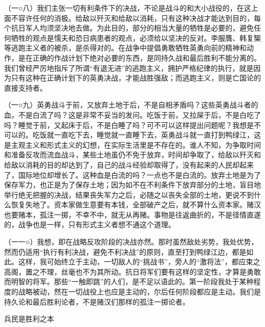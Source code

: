 \documentclass[UTF8, 12pt, a4paper]{ctexrep}
\begin{document}
（一○八）我们主张一切有利条件下的决战，不论是战斗的和大小战役的，在这上面不容许任何的消极。给敌以歼灭和给敌以消耗，只有这种决战才能达到目的，每个抗日军人均须坚决地去做。为此目的，部分的相当大量的牺牲是必要的，避免任何牺牲的观点是懦夫和恐日病患者的观点，必须给以坚决的反对。李服膺、韩复榘等逃跑主义者的被杀，是杀得对的。在战争中提倡勇敢牺牲英勇向前的精神和动作，是在正确的作战计划下绝对必要的东西，是同持久战和最后胜利不能分离的。我们曾经严厉地指斥了所谓“有退无进”的逃跑主义，拥护严格纪律的执行，就是因为只有这种在正确计划下的英勇决战，才能战胜强敌；而逃跑主义，则是亡国论的直接支持者。

（一○九）英勇战斗于前，又放弃土地于后，不是自相矛盾吗？这些英勇战斗者的血，不是白流了吗？这是非常不妥当的发问。吃饭于前，又拉屎于后，不是白吃了吗？睡觉于前，又起床于后，不是白睡了吗？可不可以这样提出问题呢？我想是不可以的。吃饭就一直吃下去，睡觉就一直睡下去，英勇战斗就一直打到鸭绿江，这是主观主义和形式主义的幻想，在实际生活里是不存在的。谁人不知，为争取时间和准备反攻而流血战斗，某些土地虽仍不免于放弃，时间却争取了，给敌以歼灭和给敌以消耗的目的却达到了，自己的战斗经验却取得了，没有起来的人民却起来了，国际地位却增长了。这种血是白流的吗？一点也不是白流的。放弃土地是为了保存军力，也正是为了保存土地；因为如不在不利条件下放弃部分的土地，盲目地举行绝无把握的决战，结果丧失军力之后，必随之以丧失全部的土地，更说不到什么恢复失地了。资本家做生意要有本钱，全部破产之后，就不算什么资本家。赌汉也要赌本，孤注一掷，不幸不中，就无从再赌。事物是往返曲折的，不是径情直遂的，战争也是一样，只有形式主义者想不通这个道理。

（一一○）我想，即在战略反攻阶段的决战亦然。那时虽然敌处劣势，我处优势，然而仍适用“执行有利决战，避免不利决战”的原则，直至打到鸭绿江边，都是如此。这样，我可始终立于主动，一切敌人的“挑战书”，旁人的“激将法”，都应束之高阁，置之不理，丝毫也不为其所动。抗日将军们要有这样的坚定性，才算是勇敢而明智的将军。那些“一触即跳”的人们，是不足以语此的。第一阶段我处于某种程度的战略被动，然在一切战役上也应是主动的，尔后任何阶段都应是主动。我们是持久论和最后胜利论者，不是赌汉们那样的孤注一掷论者。

兵民是胜利之本
\end{document}
